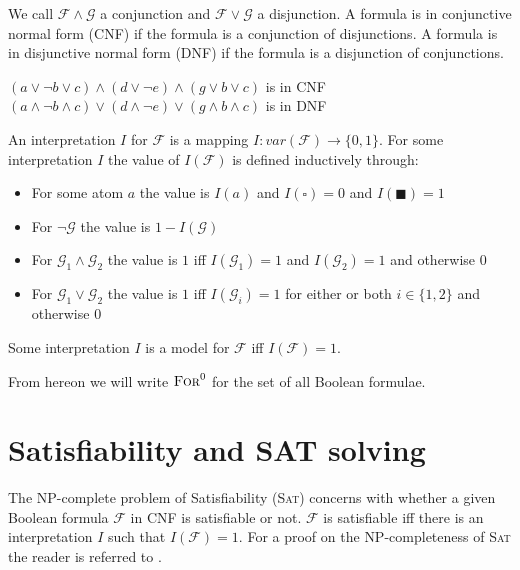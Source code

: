 \begin{definition}
We call $\mathcal{F}\land\mathcal{G}$  a conjunction and $\mathcal{F}\lor\mathcal{G}$ a disjunction.
A formula is in conjunctive normal form (CNF) if the formula is a conjunction of disjunctions.
A formula is in disjunctive normal form (DNF) if the formula is a disjunction of conjunctions.
\end{definition}
\begin{example}
$\left(a \lor \neg b \lor c\right)\land\left(d \lor \neg e\right)\land\left(g \lor b \lor c\right)$ is in CNF\\
$\left(a \land \neg b \land c\right)\lor\left(d \land \neg e\right)\lor\left(g \land b \land c\right)$ is in DNF\\
\end{example}
\begin{definition}
An interpretation $I$ for $\mathcal{F}$ is a mapping $I\colon var(\mathcal{F}) \to \{0,1\}$.
For some interpretation $I$ the value of $I(\mathcal{F})$ is defined inductively through:
\begin{itemize}
    \item For some atom $a$ the value is $I(a)$ and $I\left(\square\right)=0$ and $I\left(\blacksquare\right)=1$
    \item For $\neg\mathcal{G}$ the value is $1-I(\mathcal{G})$
    \item For $\mathcal{G}_1 \land \mathcal{G}_2$ the value is $1$ iff $I(\mathcal{G}_1)=1$ and $I(\mathcal{G}_2)=1$  and otherwise $0$
    \item For $\mathcal{G}_1 \lor \mathcal{G}_2$ the value is $1$ iff $I(\mathcal{G}_i)=1$ for either or both $i\in\{1,2\}$ and otherwise $0$
\end{itemize}

Some interpretation $I$ is a model for $\mathcal{F}$ iff $I(\mathcal{F})=1$.
\end{definition}
From hereon we will write $\textsc{For}^0$ for the set of all Boolean formulae.


\section{Satisfiability and SAT solving}
The \textsc{NP}-complete problem of Satisfiability (\textsc{Sat}) concerns with whether a given Boolean formula $\mathcal{F}$ in CNF is satisfiable or not. $\mathcal{F}$ is satisfiable iff there is an interpretation $I$ such that $I(\mathcal{F})=1$. For a proof on the \textsc{NP}-completeness of \textsc{Sat} the reader is referred to \cite{Garey-Intractability}.

